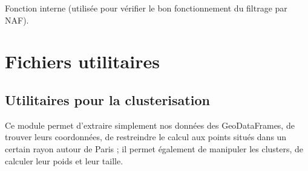 \documentclass[letterpaper,10pt,french]{sphinxmanual}
\begin{document}

\begin{fulllineitems}
\label{\detokenize{index:src.clusterizer.clusterizer.test_naf}}
\sphinxAtStartPar
Fonction interne (utilisée pour vérifier le bon fonctionnement du filtrage par NAF).

\end{fulllineitems}



\section{Fichiers utilitaires}
\label{\detokenize{index:fichiers-utilitaires}}

\subsection{Utilitaires pour la clusterisation}
\label{\detokenize{index:module-src.clusterizer.utils.clusterizer_utils}}\label{\detokenize{index:utilitaires-pour-la-clusterisation}}
\sphinxAtStartPar
Ce module permet d’extraire simplement nos données des GeoDataFrames, de trouver
leurs coordonnées, de restreindre le calcul aux points situés dans un certain rayon
autour de Paris ; il permet également de manipuler les clusters, de calculer leur 
poids et leur taille.
\end{document}
